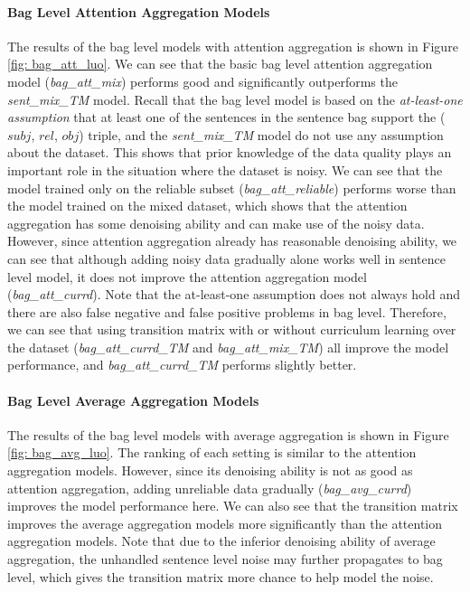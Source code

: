 \paragraph{Bag Level Attention Aggregation Models}
The results of the bag level models with attention aggregation is shown in Figure \ref{fig: bag_att_luo}. We can see that the basic bag level attention aggregation model (\emph{bag\_att\_mix}) performs good and significantly outperforms the \emph{sent\_mix\_TM} model. Recall that the bag level model is based on the \emph{at-least-one assumption} that at least one of the sentences in the sentence bag support the ($subj$, $rel$, $obj$) triple, and the \emph{sent\_mix\_TM} model do not use any assumption about the dataset. This shows that prior knowledge of the data quality plays an important role in the situation where the dataset is noisy. We can see that the model trained only on the reliable subset (\emph{bag\_att\_reliable}) performs worse than the model trained on the mixed dataset, which shows that the attention aggregation has some denoising ability and can make use of the noisy data. However, since attention aggregation already has reasonable denoising ability, we can see that although adding noisy data gradually alone works well in sentence level model, it does not improve the attention aggregation model (\emph{bag\_att\_currd}). Note that the at-least-one assumption does not always hold and there are also false negative and false positive problems in bag level. Therefore, we can see that using transition matrix with or without curriculum learning over the dataset (\emph{bag\_att\_currd\_TM} and \emph{bag\_att\_mix\_TM}) all improve the model performance, and \emph{bag\_att\_currd\_TM} performs slightly better.

\paragraph{Bag Level Average Aggregation Models}
The results of the bag level models with average aggregation is shown in Figure \ref{fig: bag_avg_luo}. The ranking of each setting is similar to the attention aggregation models. However, since its denoising ability is not as good as attention aggregation, adding unreliable data gradually (\emph{bag\_avg\_currd}) improves the model performance here. We can also see that the transition matrix improves the average aggregation models more significantly than the attention aggregation models. Note that due to the inferior denoising ability of average aggregation, the unhandled sentence level noise may further propagates to bag level, which gives the transition matrix more chance to help model the noise.
 
